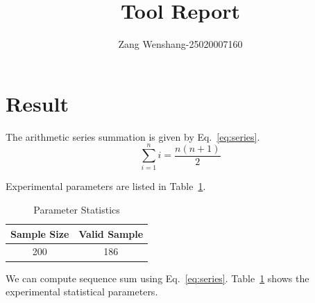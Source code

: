 \documentclass{article}
\begin{document}
\title{Tool Report}
\author{Zang Wenshang-25020007160}
\maketitle
\section{Result}

The arithmetic series summation is given by Eq.~\eqref{eq:series}.
\begin{equation}\label{eq:series}
\sum_{i=1}^{n}i=\frac{n(n+1)}{2}
\end{equation}

Experimental parameters are listed in Table~\ref{tab:param}.
\begin{table}[htbp]
\centering
\caption{Parameter Statistics}
\label{tab:param}
\begin{tabular}{|c|c|}
\hline
Sample Size & Valid Sample \\
\hline
200 & 186 \\
\hline
\end{tabular}
\end{table}

We can compute sequence sum using Eq.~\eqref{eq:series}. Table~\ref{tab:param} shows the experimental statistical parameters.
\end{document}
